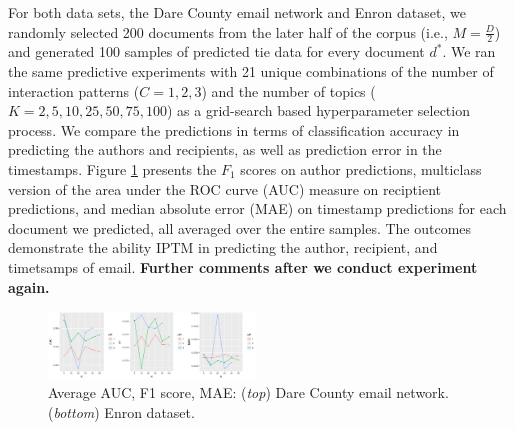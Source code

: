 \documentclass{article}
\begin{document}
For both data sets, the Dare County email network and Enron dataset, we randomly selected 200 documents from the later half of the corpus (i.e., $M = \frac{D}{2}$) and generated 100 samples of predicted tie data for every document $d^*$. We ran the same predictive experiments with 21 unique combinations of the number of interaction patterns ($C = 1, 2, 3$) and the number of topics ($K = 2, 5, 10, 25, 50, 75, 100$) as a grid-search based hyperparameter selection process. We compare the predictions in terms of classification accuracy in predicting the authors and recipients, as well as prediction error in the timestamps. Figure \ref{fig:PPE} presents the $F_1$ scores on author predictions, multiclass version of the area under the ROC curve (AUC) measure \cite{hand2001simple} on reciptient predictions, and median absolute error (MAE) on timestamp predictions for each document we predicted, all averaged over the entire samples. The outcomes demonstrate the ability IPTM in predicting the author, recipient, and timetsamps of email. \textbf{Further comments after we conduct experiment again.}
\begin{figure}[h]
	\centering
	\includegraphics[width = 0.49\textwidth, trim= 0.7cm 0cm 0cm 0cm, clip=true]{plots/Dare_PPE-1.png}  
	\caption{Average AUC, F1 score, MAE: (\textit{top}) Dare County email network. (\textit{bottom}) Enron dataset.}
	\label{fig:PPE}	
\end{figure}
\end{document}
